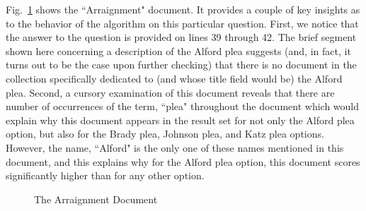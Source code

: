 Fig.~\ref{fig:concept_match_v3_example_document} shows the ``Arraignment" document.  It provides a couple of key insights as to the behavior of the algorithm on this particular question.  First, we notice that the answer to the question is provided on lines 39 through 42.  The brief segment shown here concerning a description of the Alford plea suggests (and, in fact, it turns out to be the case upon further checking) that there is no document in the collection specifically dedicated to (and whose title field would be) the Alford plea.  Second, a cursory examination of this document reveals that there are number of occurrences of the term, ``plea" throughout the document which would explain why this document appears in the result set for not only the Alford plea option, but also for the Brady plea, Johnson plea, and Katz plea options.  However, the name, ``Alford" is the only one of these names mentioned in this document, and this explains why for the Alford plea option, this document scores significantly higher than for any other option.

\begin{figure}
\centering
\vspace{0.75in}
\caption{The Arraignment Document}
\label{fig:concept_match_v3_example_document}
\end{figure}


